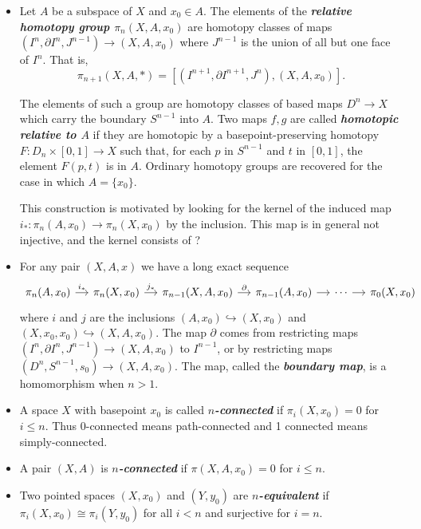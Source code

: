 \documentclass{article}
\begin{document}
\begin{defn}
\begin{itemize}
		\item Let $A$ be a subspace of $X$ and $x_0\in A$. The elements of the \textbf{\textit{relative homotopy group $\pi_n(X,A,x_0)$}} are homotopy classes of maps $(I^n,\partial I^n,J^{n-1})\to (X,A,x_0)$ where $J^{n-1}$ is the union of all but one face of $I^n$. That is,
		\[\pi_{n+1}(X,A,*)=[(I^{n+1},\partial I^{n+1},J^n),(X,A,x_0)].\]
		
		The elements of such a group are homotopy classes of based maps $D^n\to X$ which carry the boundary $S^{n-1}$ into $A$. Two maps $f,g$ are called \textbf{\textit{homotopic relative to $A$}} if they are homotopic by a basepoint-preserving homotopy $F:D_n\times[0,1]\to X$ such that, for each $p$ in $S^{n-1}$ and $t$ in $[0,1]$, the element $F(p,t)$ is in $A$. Ordinary homotopy groups are recovered for the case in which $A=\{x_0\}$.
		\begin{remark}
			This construction is motivated by looking for the kernel of the induced map $i_*:\pi_n(A,x_0)\to\pi_n(X,x_0)$ by the inclusion. This map is in general not injective, and the kernel consists of ?
		\end{remark}
		\item For any pair $(X,A,x)$ we have a long exact sequence
		\[\begin{tikzcd}[column sep=small]
			\pi_n(A,x_0)\arrow[r,"i_*"]&\pi_{n}(X,x_0)\arrow[r,"j_*"]&\pi_{n-1}(X,A,x_0)\arrow[r,"\partial"]&\pi_{n-1}(A,x_0)\arrow[r]&\cdots\arrow[r]&\pi_0(X,x_0)
		\end{tikzcd}\]
		where $i$ and $j$ are the inclusions $(A,x_0)\hookrightarrow(X,x_0)$ and $(X,x_0,x_0)\hookrightarrow(X,A,x_0)$. The map $\partial$ comes from restricting maps $(I^n,\partial I^n,J^{n-1})\to (X,A,x_0)$ to $I^{n-1}$, or by restricting maps $(D^n,S^{n-1},s_0)\to (X,A,x_0)$. The map, called the \textbf{\textit{boundary map}}, is a homomorphism when $n>1$.
		
		\item A space $X$ with basepoint $x_0$ is called \textbf{\textit{$n$-connected}} if $\pi_i(X,x_0)=0$ for $i\leq n$. Thus 0-connected means path-connected and 1 connected means simply-connected.
		
		\item A pair $(X,A)$ is \textbf{\textit{$n$-connected}} if $\pi(X,A,x_0)=0$ for $i\leq n$.
		
		\item Two pointed spaces $(X,x_0)$ and $(Y,y_0)$ are \textbf{\textit{$n$-equivalent}} if $\pi_i(X,x_0)\cong\pi_i(Y,y_0)$ for all $i< n$ and surjective for $i=n$.
	\end{itemize}
\end{defn}
\end{document}
